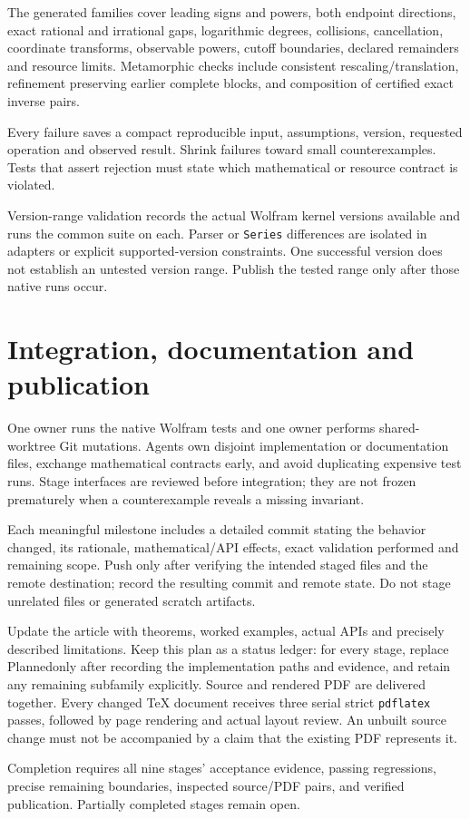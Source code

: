 \documentclass[11pt,a4paper]{article}
\newcommand{\wl}[1]{\texttt{#1}}
\newcommand{\planned}{\textsf{Planned}}
\begin{document}
The generated families cover leading signs and powers, both endpoint directions, exact rational and irrational gaps, logarithmic degrees, collisions, cancellation, coordinate transforms, observable powers, cutoff boundaries, declared remainders and resource limits. Metamorphic checks include consistent rescaling/translation, refinement preserving earlier complete blocks, and composition of certified exact inverse pairs.

Every failure saves a compact reproducible input, assumptions, version, requested operation and observed result. Shrink failures toward small counterexamples. Tests that assert rejection must state which mathematical or resource contract is violated.

Version-range validation records the actual Wolfram kernel versions available and runs the common suite on each. Parser or \wl{Series} differences are isolated in adapters or explicit supported-version constraints. One successful version does not establish an untested version range. Publish the tested range only after those native runs occur.

\clearpage
\section{Integration, documentation and publication}

One owner runs the native Wolfram tests and one owner performs shared-worktree Git mutations. Agents own disjoint implementation or documentation files, exchange mathematical contracts early, and avoid duplicating expensive test runs. Stage interfaces are reviewed before integration; they are not frozen prematurely when a counterexample reveals a missing invariant.

Each meaningful milestone includes a detailed commit stating the behavior changed, its rationale, mathematical/API effects, exact validation performed and remaining scope. Push only after verifying the intended staged files and the remote destination; record the resulting commit and remote state. Do not stage unrelated files or generated scratch artifacts.

Update the article with theorems, worked examples, actual APIs and precisely described limitations. Keep this plan as a status ledger: for every stage, replace \planned only after recording the implementation paths and evidence, and retain any remaining subfamily explicitly. Source and rendered PDF are delivered together. Every changed TeX document receives three serial strict \wl{pdflatex} passes, followed by page rendering and actual layout review. An unbuilt source change must not be accompanied by a claim that the existing PDF represents it.

Completion requires all nine stages' acceptance evidence, passing regressions, precise remaining boundaries, inspected source/PDF pairs, and verified publication. Partially completed stages remain open.
\end{document}
